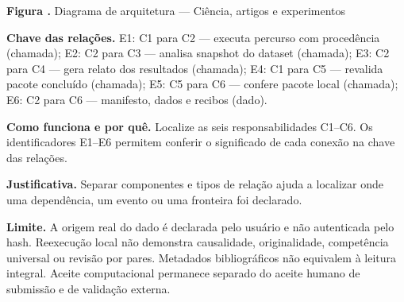{\small\textbf{Figura \thefigure.} Diagrama de arquitetura --- Ciência, artigos e experimentos}\par\smallskip
{\footnotesize\textbf{Chave das relações.} E1: C1 para C2 --- executa percurso com procedência (chamada); E2: C2 para C3 --- analisa snapshot do dataset (chamada); E3: C2 para C4 --- gera relato dos resultados (chamada); E4: C1 para C5 --- revalida pacote concluído (chamada); E5: C5 para C6 --- confere pacote local (chamada); E6: C2 para C6 --- manifesto, dados e recibos (dado).}\par\smallskip
\noindent\textbf{Como funciona e por quê.} Localize as seis responsabilidades C1--C6. Os identificadores E1--E6 permitem conferir o significado de cada conexão na chave das relações.\par
\noindent\textbf{Justificativa.} Separar componentes e tipos de relação ajuda a localizar onde uma dependência, um evento ou uma fronteira foi declarado.\par
\noindent\textbf{Limite.} A origem real do dado é declarada pelo usuário e não autenticada pelo hash. Reexecução local não demonstra causalidade, originalidade, competência universal ou revisão por pares. Metadados bibliográficos não equivalem à leitura integral. Aceite computacional permanece separado do aceite humano de submissão e de validação externa.\par\smallskip
{}
